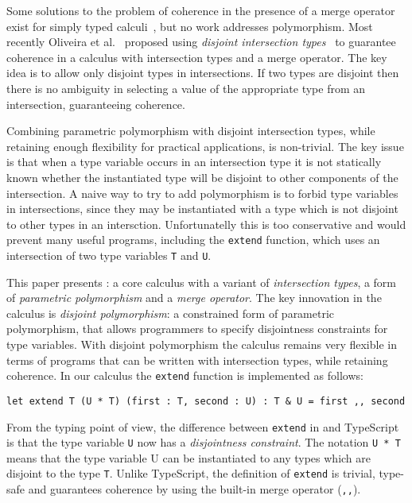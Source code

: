 Some solutions to the problem of coherence in the presence 
of a merge operator exist for simply typed calculi~\cite{}, but no
work addresses polymorphism. Most recently Oliveira
et al.~\cite{oliveira16disjoint} proposed using \emph{disjoint intersection types}~\cite{oliveira16disjoint} to 
guarantee coherence in a calculus with intersection types and a merge 
operator. The key idea is to allow only disjoint types in
intersections. If two types are disjoint then there is no ambiguity in
selecting a value of the appropriate type from an intersection, 
guaranteeing coherence.

Combining parametric polymorphism with disjoint intersection
types, while retaining enough flexibility for practical applications,
is non-trivial. The key issue is that when a type variable occurs in an intersection
type it is not statically known whether the instantiated type will
be disjoint to other components of the intersection.
A naive way  to try to add polymorphism is to forbid 
type variables in intersections, since they may be instantiated with 
a type which is not disjoint to other types in an intersction.
Unfortunatelly this is too conservative and would prevent many useful 
programs, including the \lstinline{extend} function, which uses an
intersection of two type variables \lstinline{T} and \lstinline{U}. 


This paper presents \name: a core calculus with a variant of
\emph{intersection types}, a form of \emph{parametric polymorphism} and a
\emph{merge operator}. The key innovation in the calculus is \emph{disjoint polymorphism}: a
constrained form of parametric polymorphism, that allows programmers
to specify disjointness constraints for type variables. With disjoint
polymorphism the calculus remains very flexible in terms of programs
that can be written with intersection types, while retaining
coherence. In our calculus the \lstinline{extend} function is implemented
as follows:

\begin{lstlisting}
let extend T (U * T) (first : T, second : U) : T & U = first ,, second 
\end{lstlisting}

\noindent From the typing point of view, the difference between
\lstinline{extend} in \name and TypeScript is that the type variable
\lstinline{U} now has a \emph{disjointness constraint}. The notation
\lstinline{U * T} means that the type variable U can be instantiated
to any types which are disjoint to the type \lstinline{T}. Unlike
TypeScript, the definition of \lstinline{extend} is trivial, type-safe
and guarantees coherence by using the built-in merge operator (\lstinline{,,}). 

